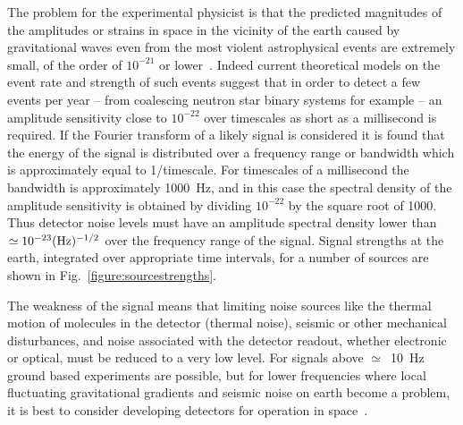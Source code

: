 \documentclass{article}
\begin{document}
The problem for the experimental physicist is that the predicted magnitudes of
the amplitudes or strains in space in the vicinity of the earth caused by
gravitational waves even from the most violent astrophysical events are
extremely small, of the order of $10^{-21}$ or lower~\cite{LISAsymposium}.
Indeed current theoretical models on the event rate and strength of such events
suggest that in order to detect a few events per year -- from coalescing neutron
star binary systems for example -- an amplitude sensitivity close to $10^{-22}$
over timescales as short as a millisecond is required. If the Fourier transform
of a likely signal is considered it is found that the energy of the signal is
distributed over a frequency range or bandwidth which is approximately equal to
1/timescale.  For timescales of a millisecond the bandwidth is approximately
1000~Hz, and in this case the spectral density of the amplitude sensitivity is
obtained by dividing $10^{-22}$ by the square root of 1000. Thus detector noise
levels must have an amplitude spectral density lower than $\simeq 10^{-23}(\rm
Hz)^{-1/2}$ over the frequency range of the signal. Signal strengths at the
earth, integrated over appropriate time intervals, for a number of sources are
shown in Fig.~\ref{figure:sourcestrengths}.


The weakness of the signal means that limiting noise sources like the thermal
motion of molecules in the detector (thermal noise), seismic or other mechanical
disturbances, and noise associated with the detector readout, whether electronic
or optical, must be reduced to a very low level. For signals above
$\simeq$~10~Hz ground based experiments are possible, but for lower frequencies
where local fluctuating gravitational gradients and seismic noise on earth
become a problem, it is best to consider developing detectors for operation in
space~\cite{LISA}.
\end{document}
